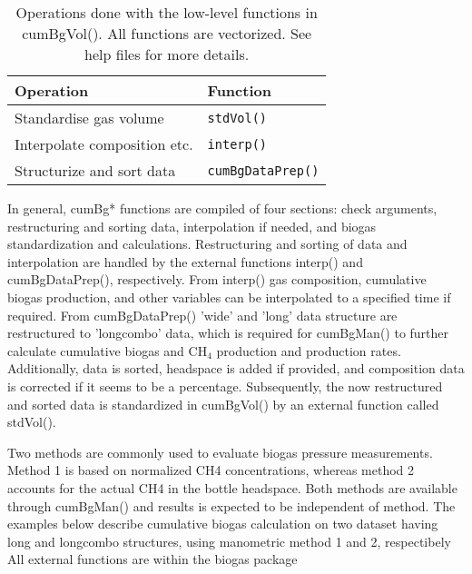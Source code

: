 \documentclass{article}
\begin{document}
\begin{table}[h!]
  \begin{center}
  \caption{Operations done with the low-level functions in cumBgVol(). All functions are vectorized. See help files for more details.}
  \label{tab:lowfunctionsummary}
  \vspace{3pt}
  
  \begin{tabular}{ll}
    \hline
    Operation                                    &   Function \\
    \hline
    Standardise gas volume                       &   \texttt{stdVol()} \\
    Interpolate composition etc.                 &   \texttt{interp()} \\
    Structurize and sort data                    &   \texttt{cumBgDataPrep()} \\   
		\hline
  \end{tabular}
  \end{center}
\end{table}

In general, cumBg* functions are compiled of four sections: check arguments, restructuring and sorting data, interpolation if needed, and biogas standardization and calculations. Restructuring and sorting of data and interpolation are handled by the external functions interp() and cumBgDataPrep(), respectively. From interp() gas composition, cumulative biogas production, and other variables can be interpolated to a specified time if required. From cumBgDataPrep() 'wide' and 'long' data structure are restructured to 'longcombo' data, which is required for cumBgMan() to further calculate cumulative biogas and CH$_4$ production and production rates. Additionally, data is sorted, headspace is added if provided, and composition data is corrected if it seems to be a percentage. Subsequently, the now restructured and sorted data is standardized in cumBgVol() by an external function called stdVol(). 

Two methods are commonly used to evaluate biogas pressure measurements. Method 1 is based on normalized CH4 concentrations, whereas method 2 accounts for the actual CH4 in the bottle headspace. Both methods are available through cumBgMan() and results is expected to be independent of method. The examples below describe cumulative biogas calculation on two dataset having long and longcombo structures, using manometric method 1 and 2, respectibely 
All external functions are within the biogas package
\end{document}

